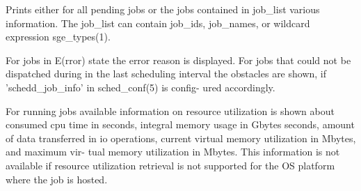 \documentclass[11pt,final,oneside]{fithesis}
\begin{document}
			Prints either for all pending jobs  or  the  jobs  contained  in  job\_list  various information. The job\_list
          can contain job\_ids, job\_names, or wildcard  expression
          sge\_types(1).

          For  jobs  in  E(rror)  state  the  error   reason   is
          displayed. For jobs that could not be dispatched during
          in the  last  scheduling  interval  the  obstacles  are
          shown, if 'schedd\_job\_info' in sched\_conf(5) is config-
          ured accordingly.

          For running  jobs  available  information  on  resource
          utilization   is  shown  about  consumed  cpu  time  in
          seconds,  integral  memory  usage  in  Gbytes  seconds,
          amount  of  data  transferred in io operations, current
          virtual memory utilization in Mbytes, and maximum  vir-
          tual  memory utilization in Mbytes. This information is
          not available if resource utilization retrieval is  not
          supported for the OS platform where the job is hosted.
          
\end{document}
